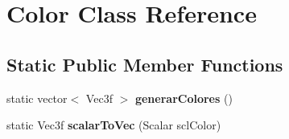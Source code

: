 \hypertarget{classColor}{}\section{Color Class Reference}
\label{classColor}
\subsection*{Static Public Member Functions}
\begin{DoxyCompactItemize}
\item 
\mbox{\label{classColor_a036f1d514a7bf1e6c36eb4231f18d43e}} 
static vector$<$ Vec3f $>$ {\bfseries generar\+Colores} ()
\item 
\mbox{\label{classColor_ae8b98ec693bfc1fde81e24f8e68a4b48}} 
static Vec3f {\bfseries scalar\+To\+Vec} (Scalar scl\+Color)
\end{DoxyCompactItemize}
